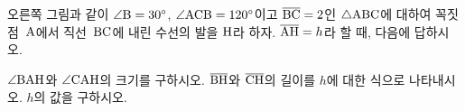 \noindent\begin{minipage}[t]{0.58\linewidth}\vspace{0pt}\raggedright 오른쪽 그림과 같이 $\angle\mathrm{B}=30^\circ$, $\angle\mathrm{ACB}=120^\circ$이고 $\overline{\mathrm{BC}}=2$인 $\triangle\mathrm{ABC}$에 대하여 꼭짓점~$\mathrm{A}$에서 직선~$\mathrm{BC}$에 내린 수선의 발을 $\mathrm{H}$라 하자. $\overline{\mathrm{AH}}=h$라 할 때, 다음에 답하시오.\end{minipage}\hfill\begin{minipage}[t]{0.4\linewidth}\vspace{0pt}\centering \resizebox{\ifdim\width>\linewidth\linewidth\else\width\fi}{!}{}\end{minipage}\par
{} $\angle\mathrm{BAH}$와 $\angle\mathrm{CAH}$의 크기를 구하시오.
 $\overline{\mathrm{BH}}$와 $\overline{\mathrm{CH}}$의 길이를 $h$에 대한 식으로 나타내시오.
 $h$의 값을 구하시오.
